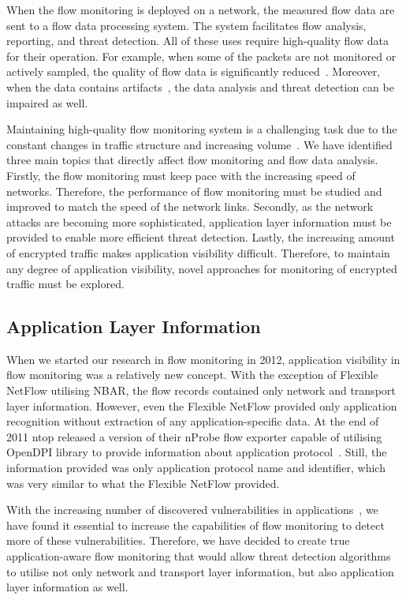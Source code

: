 When the flow monitoring is deployed on a network, the measured flow data are sent to a flow data processing system. The system facilitates flow analysis, reporting, and threat detection. All of these uses require high-quality flow data for their operation. For example, when some of the packets are not monitored or actively sampled, the quality of flow data is significantly reduced~\cite{Brauckhoff-2006-Impact}. Moreover, when the data contains artifacts~\cite{Hofstede-2013-Measurement}, the data analysis and threat detection can be impaired as well.

Maintaining high-quality flow monitoring system is a challenging task due to the constant changes in traffic structure and increasing volume~\cite{CiscoSystems-2017-Cisco}. We have identified three main topics that directly affect flow monitoring and flow data analysis. Firstly, the flow monitoring must keep pace with the increasing speed of networks. Therefore, the performance of flow monitoring must be studied and improved to match the speed of the network links. Secondly, as the network attacks are becoming more sophisticated, application layer information must be provided to enable more efficient threat detection. Lastly, the increasing amount of encrypted traffic makes application visibility difficult. Therefore, to maintain any degree of application visibility, novel approaches for monitoring of encrypted traffic must be explored. 

\subsection{Application Layer Information}

When we started our research in flow monitoring in 2012, application visibility in flow monitoring was a relatively new concept. With the exception of Flexible NetFlow utilising NBAR, the flow records contained only network and transport layer information. However, even the Flexible NetFlow provided only application recognition without extraction of any application-specific data. At the end of 2011 ntop released a version of their nProbe flow exporter capable of utilising OpenDPI library to provide information about application protocol~\cite{ntop-2011-Unveiling}. Still, the information provided was only application protocol name and identifier, which was very similar to what the Flexible NetFlow provided.

With the increasing number of discovered vulnerabilities in applications~\cite{Younan-2013-25}, we have found it essential to increase the capabilities of flow monitoring to detect more of these vulnerabilities. Therefore, we have decided to create true application-aware flow monitoring that would allow threat detection algorithms to utilise not only network and transport layer information, but also application layer information as well.

